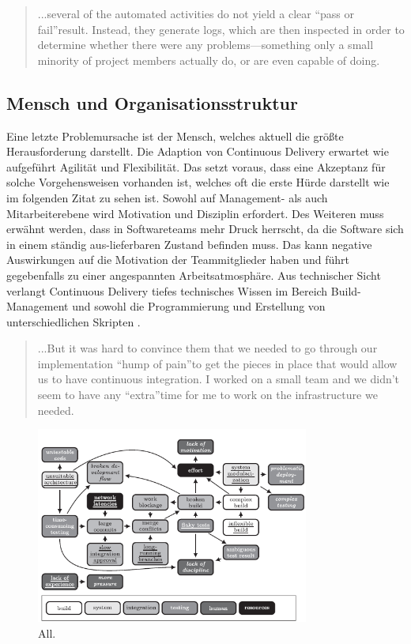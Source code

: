 \begin{quote}\glqq ...several of the automated activities do not yield a clear “pass or fail”result. Instead, they generate logs, which are then inspected in order to determine whether there were any problems—something only a small minority of project members actually do, or are even capable of doing. \grqq~\cite[S.65]{Laukkanen.2017}\end{quote}
%

\subsection{Mensch und Organisationsstruktur}
Eine letzte Problemursache ist der Mensch, welches aktuell die größte Herausforderung darstellt. Die Adaption von Continuous Delivery erwartet wie aufgeführt Agilität und Flexibilität. Das setzt voraus, dass eine Akzeptanz für solche Vorgehensweisen vorhanden ist, welches oft die erste Hürde darstellt wie im folgenden Zitat zu sehen ist. Sowohl auf Management- als auch Mitarbeiterebene wird Motivation und Disziplin erfordert. Des Weiteren muss erwähnt werden, dass in Softwareteams mehr Druck herrscht, da die Software sich in einem ständig aus-lieferbaren Zustand befinden muss. Das kann negative Auswirkungen auf die Motivation der Teammitglieder haben und führt gegebenfalls zu einer angespannten Arbeitsatmosphäre. Aus technischer Sicht verlangt Continuous Delivery tiefes technisches Wissen im Bereich Build-Management und sowohl die Programmierung und Erstellung von unterschiedlichen Skripten \cite{Laukkanen.2017}. 

\begin{quote}\glqq ...But it was hard to convince them that we needed to go through our implementation “hump of pain”to get the pieces in place that would allow us to have continuous integration. I worked on a small team and we didn’t seem to have any “extra”time for me to work on the infrastructure we needed. \grqq~\cite[S.373]{Stolberg.2009} \end{quote}
%

\begin{figure}[ht]
	\centering
	\includegraphics[width=0.8\textwidth,]{images/all}
	\caption{All\cite{Laukkanen.2017}.}
	\label{integrationsprobleme}
\end{figure}